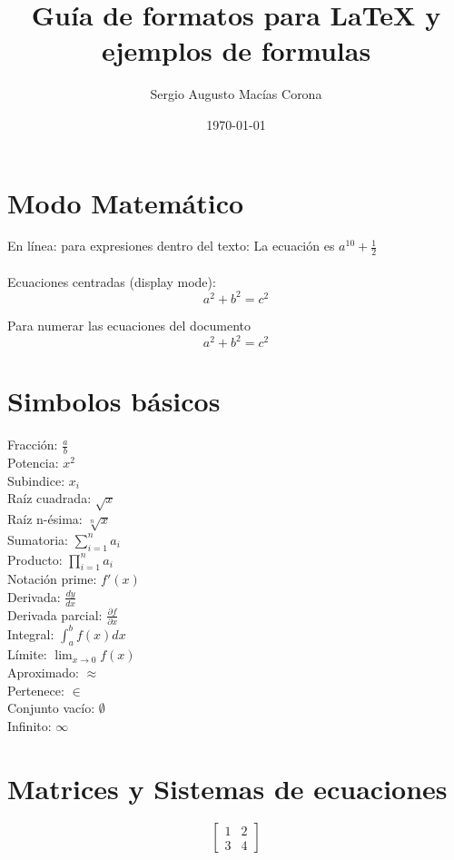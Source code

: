 \documentclass{article} %
\title{Guía de formatos para LaTeX y ejemplos de formulas}
\author{Sergio Augusto Macías Corona}
\date{\today} %
\begin{document}
\maketitle

\section{Modo Matemático}
En línea: para expresiones dentro del texto:
La ecuación es $a^{10} + \frac{1}{2}$\\
\\
Ecuaciones centradas (display mode):
\[
a^2 + b^2 = c^2
\]

Para numerar las ecuaciones del documento
\begin{equation}
a^2 + b^2 = c^2
\end{equation}

\section{Simbolos básicos}

Fracción: $\frac{a}{b}$\\
Potencia: $x^{2}$\\
Subindice: $x_{i}$\\
Raíz cuadrada: $\sqrt{x}$\\
Raíz n-ésima: $\sqrt[n]{x}$\\
Sumatoria: $\sum_{i=1}^{n} a_i$\\
Producto: $\prod_{i=1}^{n} a_i$\\
Notación prime: $f'(x)$\\
Derivada: $\frac{dy}{dx}$\\
Derivada parcial: $\frac{\partial f}{\partial x}$\\
Integral: $\int_{a}^{b} f(x) dx$\\
Límite: $\lim_{x \to 0} f(x)$\\
Aproximado: $\approx$\\
Pertenece: $\in$\\
Conjunto vacío: $\emptyset$\\
Infinito: $\infty$\\

\section{Matrices y Sistemas de ecuaciones}

\[
\begin{bmatrix}
1 & 2 \\
3 & 4
\end{bmatrix}
\]
\end{document}
